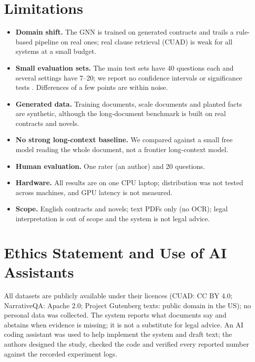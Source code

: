 \documentclass[11pt]{article}
\begin{document}
\section{Limitations}

\begin{itemize}\setlength\itemsep{0pt}
\item \textbf{Domain shift.} The GNN is trained on generated contracts and trails a rule-based pipeline on real ones; real clause retrieval (CUAD) is weak for all systems at a small budget.
\item \textbf{Small evaluation sets.} The main test sets have 40 questions each and several settings have 7--20; we report no confidence intervals or significance tests \citep{dror2018hitchhiker}. Differences of a few points are within noise.
\item \textbf{Generated data.} Training documents, scale documents and planted facts are synthetic, although the long-document benchmark is built on real contracts and novels.
\item \textbf{No strong long-context baseline.} We compared against a small free model reading the whole document, not a frontier long-context model.
\item \textbf{Human evaluation.} One rater (an author) and 20 questions.
\item \textbf{Hardware.} All results are on one CPU laptop; distribution was not tested across machines, and GPU latency is not measured.
\item \textbf{Scope.} English contracts and novels; text PDFs only (no OCR); legal interpretation is out of scope and the system is not legal advice.
\end{itemize}

\section{Ethics Statement and Use of AI Assistants}
All datasets are publicly available under their licences (CUAD: CC BY 4.0; NarrativeQA: Apache 2.0; Project Gutenberg texts: public domain in the US); no personal data was collected. The system reports what documents say and abstains when evidence is missing; it is not a substitute for legal advice. An AI coding assistant was used to help implement the system and draft text; the authors designed the study, checked the code and verified every reported number against the recorded experiment logs.
\end{document}
